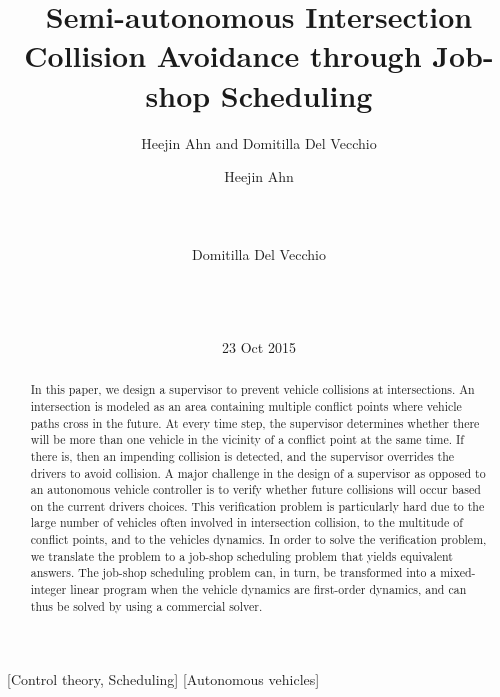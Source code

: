 \documentclass{sig-alternate}
\author{Heejin Ahn and Domitilla Del Vecchio}
\begin{document}
\title{Semi-autonomous Intersection Collision Avoidance through Job-shop Scheduling}



\author{
\alignauthor
Heejin Ahn\\
       \\
       \\
       \\
\alignauthor
Domitilla Del Vecchio\\
       \\
       \\
       \\
}
\date{23 Oct 2015}


\maketitle
\begin{abstract}
In this paper, we design a supervisor to prevent vehicle collisions at intersections. An intersection is modeled as an area containing multiple conflict points where vehicle paths cross in the future. At every time step, the supervisor determines whether there will be more than one vehicle in the vicinity of a conflict point at the same time. If there is, then an impending collision is detected, and the supervisor overrides the drivers to avoid collision. 
A major challenge in the design of a supervisor as opposed to an autonomous vehicle controller is to verify whether future collisions will occur based on the current drivers choices. This verification problem is particularly hard due to the large number of vehicles often involved in intersection collision, to the multitude of conflict points, and to the vehicles dynamics. In order to solve the verification problem, we translate the problem to a job-shop scheduling problem that yields equivalent answers. The job-shop scheduling problem can, in turn, be transformed into a mixed-integer linear program when the vehicle dynamics are first-order dynamics, and can thus be solved by using a commercial solver. 
\end{abstract}

[Control theory, Scheduling]
[Autonomous vehicles]
\end{document}

